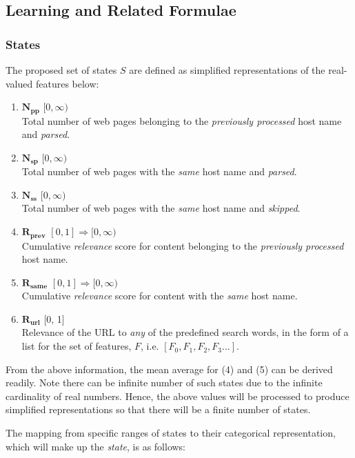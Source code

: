 \documentclass{article}
\begin{document}
\subsection{Learning and Related Formulae}
\label{sec:5.2}

\subsubsection{States}
The proposed set of states $ S $ are defined as simplified representations of the real-valued features below:

\begin{enumerate}
\item $ \boldsymbol{N_{pp}} $ $ [0, \infty) $ \\ Total number of web pages belonging to the \textit{previously processed} host name and \textit{parsed}.
\item $ \boldsymbol{N_{sp}} $ $ [0, \infty) $ \\ Total number of web pages with the \textit{same} host name and \textit{parsed}.
\item $ \boldsymbol{N_{ss}} $ $ [0, \infty) $ \\ Total number of web pages with the \textit{same} host name and \textit{skipped}.
\item $ \boldsymbol{R_{prev}} $ $ [0, 1] \Rightarrow [0, \infty) $ \\ Cumulative \textit{relevance} score for content belonging to the \textit{previously processed} host name.
\item $ \boldsymbol{R_{same}} $ $ [0, 1] \Rightarrow [0, \infty) $ \\ Cumulative \textit{relevance} score for content with the \textit{same} host name.
\item $ \boldsymbol{R_{url}} $ [0, 1] \\ Relevance of the URL to \textit{any} of the predefined search words, in the form of a list for the set of features, $ F $, i.e. $ [F_0, F_1, F_2, F_3 ...] $.
\end{enumerate}

From the above information, the mean average for (4) and (5) can be derived readily. Note there can be infinite number of such states due to the infinite cardinality of real numbers. Hence, the above values will be processed to produce simplified representations so that there will be a finite number of states.
\newpage

The mapping from specific ranges of states to their categorical representation, which will make up the \textit{state}, is as follows:
\end{document}

